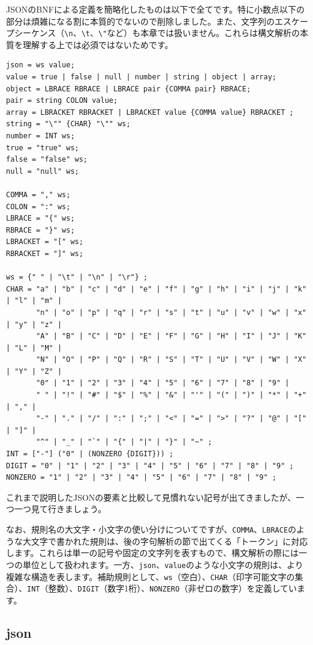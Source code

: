 JSONのBNFによる定義を簡略化したものは以下で全てです。特に小数点以下の部分は煩雑になる割に本質的でないので削除しました。また、文字列のエスケープシーケンス（\texttt{\textbackslash{}n}、\texttt{\textbackslash{}t}、\texttt{\textbackslash{}"}など）も本章では扱いません。これらは構文解析の本質を理解する上では必須ではないためです。

\begin{verbatim}
json = ws value;
value = true | false | null | number | string | object | array;
object = LBRACE RBRACE | LBRACE pair {COMMA pair} RBRACE;
pair = string COLON value;
array = LBRACKET RBRACKET | LBRACKET value {COMMA value} RBRACKET ;
string = "\"" {CHAR} "\"" ws;
number = INT ws;
true = "true" ws;
false = "false" ws;
null = "null" ws;

COMMA = "," ws;
COLON = ":" ws;
LBRACE = "{" ws;
RBRACE = "}" ws;
LBRACKET = "[" ws;
RBRACKET = "]" ws;

ws = {" " | "\t" | "\n" | "\r"} ;
CHAR = "a" | "b" | "c" | "d" | "e" | "f" | "g" | "h" | "i" | "j" | "k" | "l" | "m" |
       "n" | "o" | "p" | "q" | "r" | "s" | "t" | "u" | "v" | "w" | "x" | "y" | "z" |
       "A" | "B" | "C" | "D" | "E" | "F" | "G" | "H" | "I" | "J" | "K" | "L" | "M" |
       "N" | "O" | "P" | "Q" | "R" | "S" | "T" | "U" | "V" | "W" | "X" | "Y" | "Z" |
       "0" | "1" | "2" | "3" | "4" | "5" | "6" | "7" | "8" | "9" |
       " " | "!" | "#" | "$" | "%" | "&" | "'" | "(" | ")" | "*" | "+" | "," |
       "-" | "." | "/" | ":" | ";" | "<" | "=" | ">" | "?" | "@" | "[" | "]" |
       "^" | "_" | "`" | "{" | "|" | "}" | "~" ;
INT = ["-"] ("0" | (NONZERO {DIGIT})) ;
DIGIT = "0" | "1" | "2" | "3" | "4" | "5" | "6" | "7" | "8" | "9" ;
NONZERO = "1" | "2" | "3" | "4" | "5" | "6" | "7" | "8" | "9" ;
\end{verbatim}

これまで説明したJSONの要素と比較して見慣れない記号が出てきましたが、一つ一つ見て行きましょう。

なお、規則名の大文字・小文字の使い分けについてですが、\texttt{COMMA}、\texttt{LBRACE}のような大文字で書かれた規則は、後の字句解析の節で出てくる「トークン」に対応します。これらは単一の記号や固定の文字列を表すもので、構文解析の際には一つの単位として扱われます。一方、\texttt{json}、\texttt{value}のような小文字の規則は、より複雑な構造を表します。補助規則として、\texttt{ws}（空白）、\texttt{CHAR}（印字可能文字の集合）、\texttt{INT}（整数）、\texttt{DIGIT}（数字1桁）、\texttt{NONZERO}（非ゼロの数字）を定義しています。

\hypertarget{chapter3-json}{%
\subsection{json}\label{chapter3-json}}

